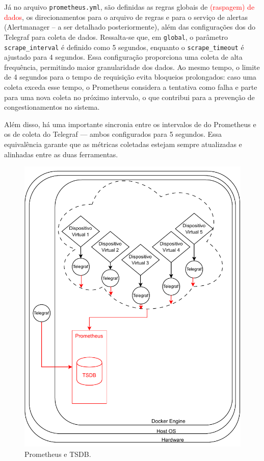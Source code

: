 Já no arquivo \verb|prometheus.yml|, são definidas as regras globais de \textcolor{red}{ (raspagem) de dados}, os direcionamentos para o arquivo de regras e para o serviço de alertas (Alertmanager -- a ser detalhado posteriormente), além das configurações dos  do Telegraf para coleta de dados. Ressalta-se que, em \verb|global|, o parâmetro \verb|scrape_interval| é definido como 5 segundos, enquanto o \verb|scrape_timeout| é ajustado para 4 segundos. Essa configuração proporciona uma coleta de alta frequência, permitindo maior granularidade dos dados. Ao mesmo tempo, o limite de 4 segundos para o tempo de requisição evita bloqueios prolongados: caso uma coleta exceda esse tempo, o Prometheus considera a tentativa como falha e parte para uma nova coleta no próximo intervalo, o que contribui para a prevenção de congestionamentos no sistema.

Além disso, há uma importante sincronia entre os intervalos de \textcolor{red}{} do Prometheus e os de coleta do Telegraf --- ambos configurados para 5 segundos. Essa equivalência garante que as métricas coletadas estejam sempre atualizadas e alinhadas entre as duas ferramentas.

\begin{figure}[H]
\centering
\includegraphics[scale=1]{Imagens/chap03/by-blocks/prometheus_diagram.pdf}
\caption{Prometheus e TSDB.}
\label{fig:DiagramaPrometheusTSDB}
\end{figure}

